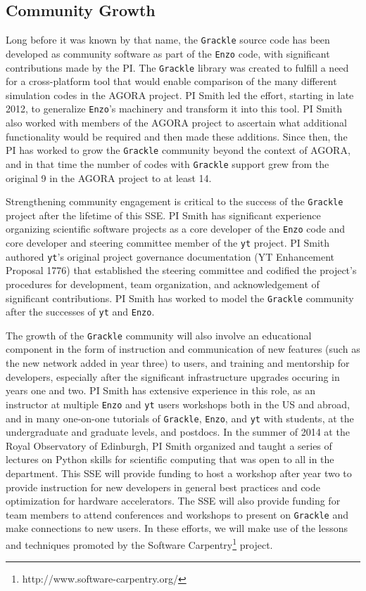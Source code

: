 \documentclass[11pt]{article}
\newcommand{\grackle}{\texttt{Grackle}}
\newcommand{\yt}{\texttt{yt}}
\begin{document}
\begin{flushleft}
\section{Community Growth}\label{sec:community_growth}

Long before it was known by that name, the \grackle{} source code has
been developed as community software as part of the \texttt{Enzo}
code, with significant contributions made by the PI.  The \grackle{}
library was created to fulfill a need
for a cross-platform tool that would enable comparison of the many
different simulation codes in the AGORA project.  PI Smith led the
effort, starting in late 2012, to generalize \texttt{Enzo}'s machinery
and transform it into this tool.  PI Smith also worked with members of
the AGORA project to ascertain what additional functionality would be
required and then made these additions.  Since then, the PI has worked
to grow the \grackle{} community beyond the context of AGORA, and in
that time the number of codes with \grackle{} support grew from the
original 9 in the AGORA project to at least 14.

Strengthening community engagement is critical to the success of the
\grackle{} project after the lifetime of this SSE.  PI Smith has
significant experience organizing scientific software projects as a
core developer of the \texttt{Enzo} code and core developer and
steering committee member of the \yt{} project.  PI Smith authored
\yt{}'s original project governance documentation (YT Enhancement
Proposal 1776) that established the steering committee and codified the
project's procedures for development, team organization, and
acknowledgement of significant contributions.  PI Smith has worked to
model the \grackle{} community after the successes of \yt{} and
\texttt{Enzo}.

The growth of the \grackle{} community will also involve an
educational component in the form of instruction and communication of
new features (such as the new network added in year three) to users,
and training and mentorship for developers, especially after the
significant infrastructure upgrades occuring in years one and two.  PI
Smith has extensive experience in this role, as an instructor at
multiple \texttt{Enzo} and \yt{} users workshops both in the US and
abroad, and in many one-on-one tutorials of \grackle{}, \texttt{Enzo},
and \yt{} with students, at the undergraduate and graduate levels, and
postdocs.  In the summer of 2014 at the Royal Observatory of
Edinburgh, PI Smith organized and taught a series of lectures on
Python skills for scientific computing that was open to all in the
department.  This SSE will provide funding to host a
workshop after year two to provide instruction for new developers in
general best practices and code optimization for hardware
accelerators.  The SSE will also provide funding for team members to
attend conferences and workshops to present on \grackle{} and make
connections to new users.  In these efforts, we will make use of the
lessons and techniques promoted by the Software
Carpentry\footnote{http://www.software-carpentry.org/} project.


\end{flushleft}
\end{document}
